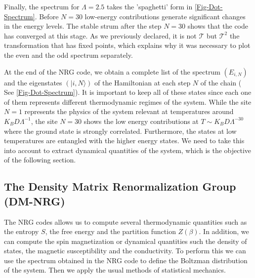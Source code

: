 Finally, the spectrum for $\Lambda = 2.5$ takes the 'spaghetti' form in \ref{Fig-Dot-Spectrum}. Before $N=30$ low-energy contributions generate significant changes in the energy levels.  The stable strum after the step $N=30$ shows that the code has converged at this stage. As we previously declared, it is not $\mathcal{T}$ but $\mathcal{T}^2$ the transformation that has fixed points, which explains why it was necessary to plot the even and the odd spectrum separately.



At the end of the NRG code, we obtain a complete list of the spectrum $(E_{i, N})$ and the eigenstates $(\vert i , N \rangle)$ of the Hamiltonian at each step $N$ of the chain ( See \ref{Fig-Dot-Spectrum}). It is important to keep all of these states since each one of them represents different thermodynamic regimes of the system. While the site $N=1$ represents the physics of the system relevant at temperatures around $K_B D \Lambda^{-1}$, the site $N=30$ shows the low energy contributions at $T \sim K_B D \Lambda^{-30}$ where the ground state is strongly correlated. Furthermore, the states at low temperatures are entangled with the higher energy states. We need to take this into account to extract dynamical quantities of the system, which is the objective of the following section. 

\subsection{The Density Matrix Renormalization Group (DM-NRG) \label{subsec:DM-NRG}}
The NRG codes allows us to compute several thermodynamic quantities such as the entropy $S$, the free energy and the partition function $Z(\beta)$. In addition, we can compute the spin magnetization or dynamical quantities such  the density of states, the magnetic susceptibility and the conductivity. To perform this we can use the spectrum obtained in the NRG code to define the Boltzman distribution of the system. Then we apply the usual methods of statistical mechanics.  

